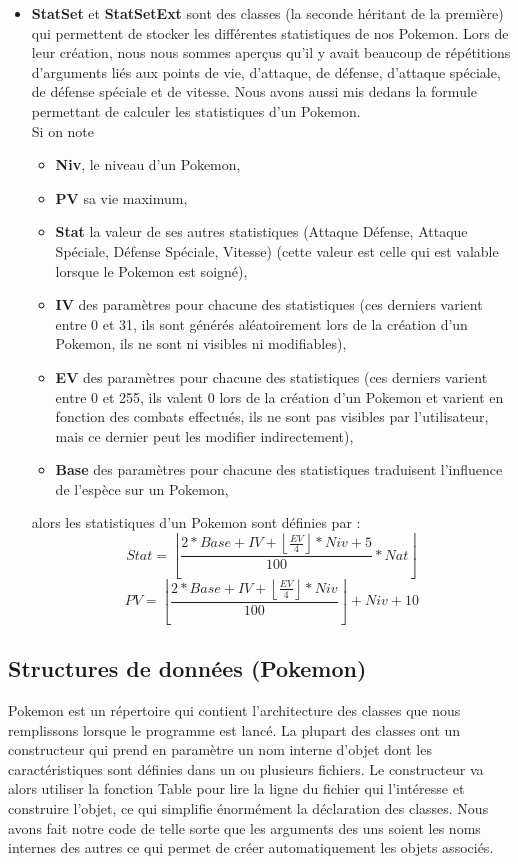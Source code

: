 \documentclass[a4paper,twoside, openany,11pt]{book}
\newcommand{\Floor}[1]{\left\lfloor #1 \right\rfloor}
\begin{document}
\begin{itemize}
\item  \textbf{StatSet} et \textbf{StatSetExt} sont des classes (la seconde héritant de la première) qui permettent de stocker les différentes statistiques de nos Pokemon. Lors de leur création, nous nous sommes aperçus qu'il y avait beaucoup de répétitions d'arguments liés aux points de vie, d'attaque, de défense, d'attaque spéciale, de défense spéciale et de vitesse. Nous avons aussi mis dedans la formule permettant de calculer les statistiques d'un Pokemon. \\
Si on note
\begin{itemize}
\item \textbf{Niv}, le niveau d'un Pokemon, \\
\item \textbf{PV} sa vie maximum, \\
\item \textbf{Stat} la valeur de ses autres statistiques (Attaque Défense, Attaque Spéciale, Défense Spéciale, Vitesse) (cette valeur est celle qui est valable lorsque le Pokemon est soigné), \\
\item \textbf{IV} des paramètres pour chacune des statistiques (ces derniers varient entre 0 et 31, ils sont générés aléatoirement lors de la création d'un Pokemon, ils ne sont ni visibles ni modifiables),\\
\item \textbf{EV} des paramètres pour chacune des statistiques (ces derniers varient entre 0 et 255, ils valent 0 lors de la création d'un Pokemon et varient en fonction des combats effectués, ils ne sont pas visibles par l'utilisateur, mais ce dernier peut les modifier indirectement),\\
\item \textbf{Base} des paramètres pour chacune des statistiques traduisent l'influence de l'espèce sur un Pokemon,
\end{itemize}
alors les statistiques d'un Pokemon sont définies par :
\[
Stat = \Floor{\dfrac{2 * Base + IV + \Floor{\frac{EV}{4}} * Niv + 5}{100} * Nat}
\]
\[
PV =\Floor{\dfrac{2 * Base + IV + \Floor{\frac{EV}{4}} * Niv}{100}} + Niv + 10
\]
\end{itemize}

\subsection{Structures de données (Pokemon)}
Pokemon est un répertoire qui contient l'architecture des classes que nous remplissons lorsque le programme est lancé. La plupart des classes ont un constructeur qui prend en paramètre un nom interne d'objet dont les caractéristiques sont définies dans un ou plusieurs fichiers. Le constructeur va alors utiliser la fonction Table pour lire la ligne du fichier qui l’intéresse et construire l'objet, ce qui simplifie énormément la déclaration des classes. Nous avons fait notre code de telle sorte que les arguments des uns soient les noms internes des autres ce qui permet de créer automatiquement les objets associés. 
\end{document}

